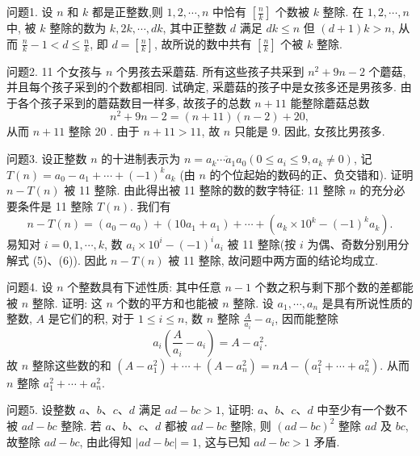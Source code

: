 
问题1. 设 $n$ 和 $k$ 都是正整数,则 $1,2, \cdots, n$ 中恰有 $\left[\frac{n}{k}\right]$ 个数被 $k$ 整除.
在 $1,2, \cdots, n$ 中, 被 $k$ 整除的数为 $k, 2 k, \cdots, d k$, 其中正整数 $d$ 满足 $d k \leqslant n$ 但 $(d+1) k>n$, 从而 $\frac{n}{k}-1<d \leqslant \frac{n}{k}$, 即 $d=\left[\frac{n}{k}\right]$, 故所说的数中共有 $\left[\frac{n}{k}\right]$ 个被 $k$ 整除.



问题2. 11 个女孩与 $n$ 个男孩去采蘑菇.
所有这些孩子共采到 $n^2+9 n-2$ 个蘑菇, 并且每个孩子采到的个数都相同.
试确定, 采蘑菇的孩子中是女孩多还是男孩多.
由于各个孩子采到的蘑菇数目一样多, 故孩子的总数 $n+11$ 能整除蘑菇总数
$$
n^2+9 n-2=(n+11)(n-2)+20,
$$
从而 $n+11$ 整除 20 . 由于 $n+11>11$, 故 $n$ 只能是 9. 因此, 女孩比男孩多.



问题3. 设正整数 $n$ 的十进制表示为 $n=\overline{a_k \cdots a_1 a_0}\left(0 \leqslant a_i \leqslant 9, a_k \neq 0\right)$, 记 $T(n)=a_0-a_1+\cdots+(-1)^k a_k$ (由 $n$ 的个位起始的数码的正、负交错和). 证明 $n-T(n)$ 被 11 整除.
由此得出被 11 整除的数的数字特征: 11 整除 $n$ 的充分必要条件是 11 整除 $T(n)$.
我们有
$$
n-T(n)=\left(a_0-a_0\right)+\left(10 a_1+a_1\right)+\cdots+\left(a_k \times 10^k-(-1)^k a_k\right) .
$$
易知对 $i=0,1, \cdots, k$, 数 $a_i \times 10^i-(-1)^i a_i$ 被 11 整除(按 $i$ 为偶、奇数分别用分解式 (5)、(6)). 因此 $n-T(n)$ 被 11 整除, 故问题中两方面的结论均成立.



问题4. 设 $n$ 个整数具有下述性质: 其中任意 $n-1$ 个数之积与剩下那个数的差都能被 $n$ 整除.
证明: 这 $n$ 个数的平方和也能被 $n$ 整除.
设 $a_1, \cdots, a_n$ 是具有所说性质的整数, $A$ 是它们的积, 对于 $1 \leqslant i \leqslant n$, 数 $n$ 整除 $\frac{A}{a_i}-a_i$, 因而能整除
$$
a_i\left(\frac{A}{a_i}-a_i\right)=A-a_i^2 .
$$
故 $n$ 整除这些数的和 $\left(A-a_1^2\right)+\cdots+\left(A-a_n^2\right)=n A-\left(a_1^2+\cdots+a_n^2\right)$. 从而 $n$ 整除 $a_1^2+\cdots+a_n^2$.



问题5. 设整数 $a 、 b 、 c 、 d$ 满足 $a d-b c>1$, 证明: $a 、 b 、 c 、 d$ 中至少有一个数不被 $a d-b c$ 整除.
若 $a 、 b 、 c 、 d$ 都被 $a d-b c$ 整除, 则 $(a d-b c)^2$ 整除 $a d$ 及 $b c$, 故整除 $a d-b c$, 由此得知 $|a d-b c|=1$, 这与已知 $a d-b c>1$ 矛盾.


